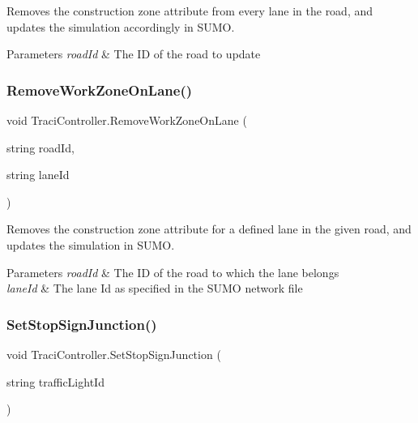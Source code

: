 Removes the construction zone attribute from every lane in the road, and updates the simulation accordingly in S\+U\+MO. 


\begin{DoxyParams}{Parameters}
{\em road\+Id} & The ID of the road to update \\
\hline
\end{DoxyParams}
\mbox{\label{class_traci_controller_af8e5c5fefc5582cd12aeaca1b0663ac4}} 
\subsubsection{\texorpdfstring{RemoveWorkZoneOnLane()}{RemoveWorkZoneOnLane()}}
{\footnotesize\ttfamily void Traci\+Controller.\+Remove\+Work\+Zone\+On\+Lane (\begin{DoxyParamCaption}\item[{string}]{road\+Id,  }\item[{string}]{lane\+Id }\end{DoxyParamCaption})}



Removes the construction zone attribute for a defined lane in the given road, and updates the simulation in S\+U\+MO. 


\begin{DoxyParams}{Parameters}
{\em road\+Id} & The ID of the road to which the lane belongs\\
\hline
{\em lane\+Id} & The lane Id as specified in the S\+U\+MO network file\\
\hline
\end{DoxyParams}
\mbox{\label{class_traci_controller_a033fdbe17b1d457bc59de0c2cdbe13ac}} 
\subsubsection{\texorpdfstring{SetStopSignJunction()}{SetStopSignJunction()}}
{\footnotesize\ttfamily void Traci\+Controller.\+Set\+Stop\+Sign\+Junction (\begin{DoxyParamCaption}\item[{string}]{traffic\+Light\+Id }\end{DoxyParamCaption})}



